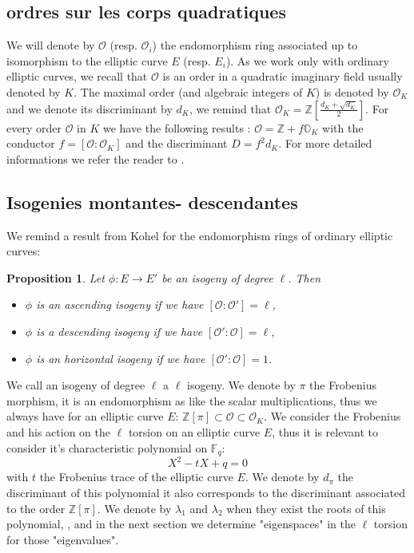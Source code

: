 \documentclass{article}
\theoremstyle{plain}
\newtheorem{prop}[thm]{Proposition}
\theoremstyle{definition}
\theoremstyle{remark}
\begin{document}
\subsection{ordres sur les corps quadratiques}%
We will denote by $\mathcal{O}$ (resp. $\mathcal{O}_i$) the endomorphism ring associated up to isomorphism to the elliptic curve $E$ (resp. $E_i$). As we work only with ordinary elliptic curves, we recall that $\mathcal{O}$ is an order in a quadratic imaginary field usually denoted by $K$. The maximal order (and algebraic integers of $K$) is denoted by $\mathcal{O}_K$ and we denote its discriminant by $d_K$, we remind that $\mathcal{O}_K=\mathbb{Z}[\frac{d_K+\sqrt{d_K}}{2}]$. For every order $\mathcal{O}$ in $K$ we have the following results : $\mathcal{O}= \mathbb{Z}+ f \mathbb{O}_K$ with the conductor $f=[\mathcal{O}:\mathcal{O}_K]$ and the discriminant $D=f^2d_K$. For more detailed informations we refer the reader to \cite{Cox89}.

\subsection{Isogenies montantes- descendantes}
We remind a result from Kohel \cite{Kohel} for the endomorphism rings of ordinary elliptic curves:
\begin{prop}
Let $\phi:E \rightarrow E'$ be an isogeny of degree $\ell$. Then 
\begin{itemize}
\item $\phi$ is an ascending isogeny if we have $[\mathcal{O}:\mathcal{O'}]=\ell$,
\item $\phi$ is a descending isogeny if we have $[\mathcal{O'}:\mathcal{O}]=\ell$,
\item $\phi$ is an horizontal isogeny if we have $[\mathcal{O'}:\mathcal{O}]=1$.
\end{itemize}
\end{prop}
We call an isogeny of degree $\ell$ a $\ell$ isogeny.
We denote by $\pi$ the Frobenius morphism, it is an endomorphism as like the scalar multiplications, thus we always have for an elliptic curve $E$:
$\mathbb{Z}[\pi] \subset \mathcal{O} \subset \mathcal{O}_K$.
We consider the Frobenius and his action on the $\ell$ torsion on an elliptic curve $E$, thus it is relevant to consider it's characteristic polynomial on $\mathbb{F}_q$:
\begin{equation}
X^2 - tX +q = 0
\end{equation}
with $t$ the Frobenius trace of the elliptic curve $E$. We denote by $d_{\pi}$ the discriminant of this polynomial it also corresponds to the discriminant associated to the order $\mathbb{Z}[\pi]$. We denote by $\lambda_1$ and $\lambda_2$ when they exist the roots of this polynomial, , and in the next section we  determine "eigenspaces" in the $\ell$ torsion for those "eigenvalues".
\end{document}
